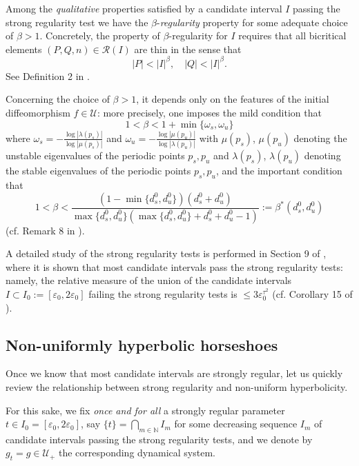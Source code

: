 \documentclass[12pt]{amsart}
\numberwithin{equation}{section}
\theoremstyle{definition}
\newcommand{\<}{{\langle}}
\renewcommand{\>}{{\rangle}}
\begin{document}
Among the \emph{qualitative} properties satisfied by a candidate interval $I$ passing the strong regularity test we have the $\beta$-\emph{regularity} property for some adequate choice of $\beta>1$. Concretely, the property of $\beta$-regularity for $I$ requires that all bicritical elements $(P, Q, n)\in\mathcal{R}(I)$ are thin in the sense that  
$$|P|<|I|^{\beta}, \quad |Q|<|I|^{\beta}.$$
See Definition 2 in \cite{PY09}. 

Concerning the choice of $\beta>1$, it depends only on the features of the initial diffeomorphism $f\in\mathcal{U}$: more precisely, one imposes the mild condition that \begin{equation}\label{e.beta-def-0}
1<\beta< 1 + \min\{\omega_s,\omega_u\}
\end{equation} 
where $\omega_s=-\frac{\log|\lambda(p_s)|}{\log|\mu(p_s)|}$ and $\omega_u=-\frac{\log|\mu(p_u)|}{\log|\lambda(p_u)|}$ with $\mu(p_s)$, $\mu(p_u)$ denoting the unstable eigenvalues of the periodic points $p_s, p_u$ and $\lambda(p_s)$, $\lambda(p_u)$ denoting the stable eigenvalues of the periodic points $p_s, p_u$, and the important condition that 
\begin{equation}\label{e.beta-def}1<\beta<\frac{(1-\min\{d_s^0, d_u^0\})(d_s^0+d_u^0)}{\max\{d_s^0, d_u^0\}(\max\{d_s^0, d_u^0\} + d_s^0+d_u^0-1)}:=\beta^*(d_s^0,d_u^0)
\end{equation}
(cf. Remark 8 in \cite{PY09}). 

A detailed study of the strong regularity tests is performed in Section 9 of \cite{PY09}, where it is shown that most candidate intervals pass the strong regularity tests: namely, the relative measure of the union of the candidate intervals $I\subset I_0:=[\varepsilon_0, 2\varepsilon_0]$ failing the strong regularity tests is $\leq 3\varepsilon_0^{\tau^2}$ (cf. Corollary 15 of \cite{PY09}).

\subsection{Non-uniformly hyperbolic horseshoes}

Once we know that most candidate intervals are strongly regular, let us quickly review the relationship between strong regularity and non-uniform hyperbolicity. 

For this sake, we fix \emph{once and for all} a strongly regular parameter $t\in I_0=[\varepsilon_0, 2\varepsilon_0]$, say $\{t\}=\bigcap\limits_{m\in\mathbb{N}} I_m$ for some decreasing sequence $I_m$ of candidate intervals passing the strong regularity tests, and we denote by $g_t=g\in\mathcal{U}_+$ the corresponding dynamical system. 
\end{document}
